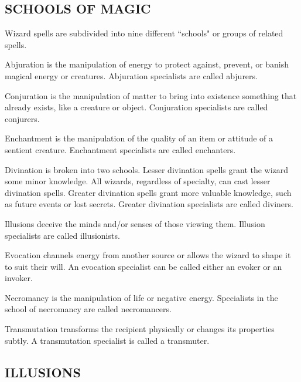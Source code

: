 \begin{multicols}{2}
 
\subsection{SCHOOLS OF MAGIC}

Wizard spells are subdivided into nine different ``schools" or groups of related spells.

Abjuration is the manipulation of energy to protect against, prevent, or banish magical energy or creatures.  Abjuration specialists are called abjurers.  

Conjuration is the manipulation of matter to bring into existence something that already exists, like a creature or object.  Conjuration specialists are called conjurers. 

Enchantment is the manipulation of the quality of an item or attitude of a sentient creature.  Enchantment specialists are called enchanters.

Divination is broken into two schools.  Lesser divination spells grant the wizard some minor knowledge.  All wizards, regardless of specialty, can cast lesser divination spells.  Greater divination spells grant more valuable knowledge, such as future events or lost secrets.  Greater divination specialists are called diviners. 

Illusions deceive the minds and/or senses of those viewing them.  Illusion specialists are called illusionists.

Evocation channels energy from another source or allows the wizard to shape it to suit their will.  An evocation specialist can be called either an evoker or an invoker.  

Necromancy is the manipulation of life or negative energy.  Specialists in the school of necromancy are called necromancers.

Transmutation transforms the recipient physically or changes its properties subtly.   A transmutation specialist is called a transmuter.

\subsection{ILLUSIONS}


\end{multicols}
